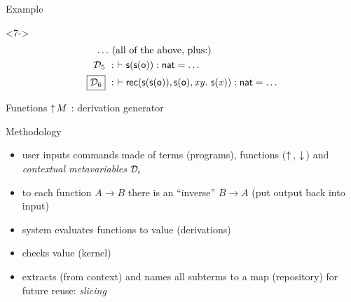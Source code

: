 \begin{frame}{\textcolor{greenish}{Example}}

  \theprompt

  \begin{visibleenv}<7->
    \begin{align*}
      \ldots &\ \text{(all of the above, plus:)}\\
      \mathcal D_5\ &:\ \vdash \text{\textsf{s}} ({\text{\textsf{s}} ({\text{\textsf{o}}})}):\text{\textsf{nat}} = \ldots \\
      \fbox{$\mathcal D_6$}\ &:\ \vdash \text{\textsf{rec}}({\text{\textsf{s}} ({\text{\textsf{s}} ({\text{\textsf{o}}})})},{\text{\textsf{s}} ({\text{\textsf{o}}})},{\text{\textit{x}}}{\text{\textit{y}}}.\ {\text{\textsf{s}} ({\text{\textit{x}}})}):\text{\textsf{nat}} = \ldots
    \end{align*}
  \end{visibleenv}
  \vfill
    \begin{block}{Functions}
      $\uparrow\!{M}$ : derivation generator \\
    \end{block}

\end{frame}

\begin{frame}{Methodology}
  \begin{itemize}
  \item user inputs commands made of terms (programs), functions
    ($\uparrow\!{}$, $\downarrow\!{}$) and \emph{contextual metavariables} $\mathcal D_i$
  \item to each function $A\to B$ there is an ``inverse'' $B\to A$
    (put output back into input)
  \item system evaluates functions to value (derivations)
  \item checks value (kernel)
  \item extracts (from context) and names all subterms to a map
    (repository) for future reuse: \emph{slicing}
  \end{itemize}
\end{frame}


